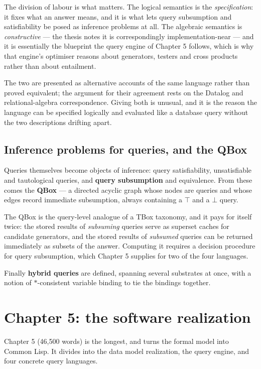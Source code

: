 \documentclass[11pt,a4paper,DIV=12,parskip=half]{scrartcl}
\begin{document}
The division of labour is what matters. The logical semantics is the
\emph{specification}: it fixes what an answer means, and it is what lets query
subsumption and satisfiability be posed as inference problems at all. The
algebraic semantics is \emph{constructive} --- the thesis notes it is
correspondingly implementation-near --- and it is essentially the blueprint the
query engine of Chapter 5 follows, which is why that engine's optimiser reasons
about generators, testers and cross products rather than about entailment.

The two are presented as alternative accounts of the same language rather than
proved equivalent; the argument for their agreement rests on the Datalog and
relational-algebra correspondence. Giving both is unusual, and it is the reason
the language can be specified logically and evaluated like a database query
without the two descriptions drifting apart.

\subsection{Inference problems for queries, and the QBox}

Queries themselves become objects of inference: query satisfiability,
unsatisfiable and tautological queries, and \textbf{query subsumption} and
equivalence. From these comes the \textbf{QBox} --- a directed acyclic graph
whose nodes are queries and whose edges record immediate subsumption, always
containing a $\top$ and a $\bot$ query.

The QBox is the query-level analogue of a TBox taxonomy, and it pays for itself
twice: the stored results of \emph{subsuming} queries serve as superset caches
for candidate generators, and the stored results of \emph{subsumed} queries can
be returned immediately as subsets of the answer. Computing it requires a
decision procedure for query subsumption, which Chapter 5 supplies for two of the
four languages.

Finally \textbf{hybrid queries} are defined, spanning several substrates at once,
with a notion of $*$-consistent variable binding to tie the bindings together.

\section{Chapter 5: the software realization}

Chapter 5 (46,500 words) is the longest, and turns the formal model into Common
Lisp. It divides into the data model realization, the query engine, and four
concrete query languages.
\end{document}
